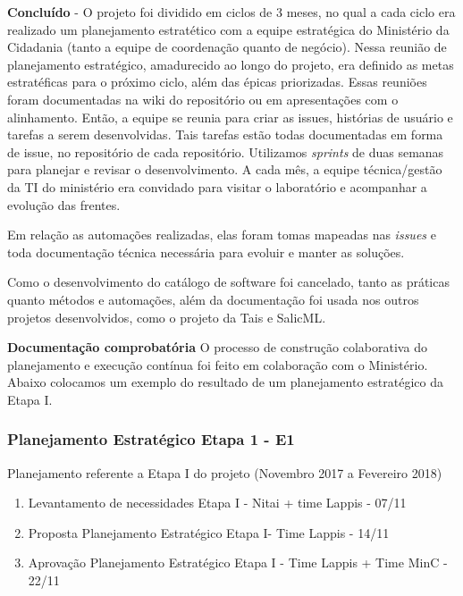 \textbf{Concluído} - O projeto foi dividido em ciclos de 3 meses, no
qual a cada ciclo era realizado um planejamento estratético com a equipe
estratégica do Ministério da Cidadania (tanto a equipe de coordenação
quanto de negócio). Nessa reunião de planejamento estratégico,
amadurecido ao longo do projeto, era definido as metas estratéficas para
o próximo ciclo, além das épicas priorizadas. Essas reuniões foram
documentadas na wiki do repositório ou em apresentações com o
alinhamento. Então, a equipe se reunia para criar as issues, histórias
de usuário e tarefas a serem desenvolvidas. Tais tarefas estão todas
documentadas em forma de issue, no repositório de cada repositório.
Utilizamos \emph{sprints} de duas semanas para planejar e revisar o
desenvolvimento. A cada mês, a equipe técnica/gestão da TI do ministério
era convidado para visitar o laboratório e acompanhar a evolução das
frentes.

Em relação as automações realizadas, elas foram tomas mapeadas nas
\emph{issues} e toda documentação técnica necessária para evoluir e
manter as soluções.

Como o desenvolvimento do catálogo de software foi cancelado, tanto as
práticas quanto métodos e automações, além da documentação foi usada nos
outros projetos desenvolvidos, como o projeto da Tais e SalicML.

\textbf{Documentação comprobatória} O processo de construção
colaborativa do planejamento e execução contínua foi feito em
colaboração com o Ministério. Abaixo colocamos um exemplo do resultado
de um planejamento estratégico da Etapa I.

\hypertarget{planejamento-estratuxe9gico-etapa-1---e1}{%
\subsubsection{Planejamento Estratégico Etapa 1 -
E1}\label{planejamento-estratuxe9gico-etapa-1---e1}}

Planejamento referente a Etapa I do projeto (Novembro 2017 a Fevereiro
2018)

\begin{enumerate}
\def\labelenumi{\arabic{enumi}.}
\tightlist
\item
  Levantamento de necessidades Etapa I - Nitai + time Lappis - 07/11
\item
  Proposta Planejamento Estratégico Etapa I- Time Lappis - 14/11
\item
  Aprovação Planejamento Estratégico Etapa I - Time Lappis + Time MinC -
  22/11
\end{enumerate}

